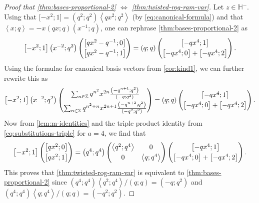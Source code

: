 \documentclass[reqno,11pt]{amsart}
\theoremstyle{definition}
\theoremstyle{remark}
\numberwithin{equation}{section}
\newcommand{\Z}{\mathbb{Z}}
\renewcommand{\H}{{\mathbb{H}}}
\newcommand{\la}{\left\langle}
\newcommand{\ra}{\right\rangle}
\newcommand{\vect}[2]{\big[{#1};{#2}\big]}
\begin{document}
\begin{proof}[Proof that \cref{thm:bases-proportional-2} $\Leftrightarrow$ \cref{thm:twisted-rog-ram-var}]
Let $z \in \H^-$. Using that $\vect{-x^2}{1} = \left(q^2; q^2\right)\la qx^2; q^2 \ra$ (by \cref{eq:canonical-formula}) and that $\la x; q \ra = -x (qx; q)\left(x^{-1}; q\right)$, one can rephrase \cref{thm:bases-proportional-2} as
\[
    \vect{-x^2}{1}\left(x^{-2}; q^2\right)
    \begin{pmatrix}
    \vect{qx^2-q^{-1}}{0} 
    \vspace{0.1cm} \\
    \vect{qx^2-q^{-1}}{1} 
    \end{pmatrix}
    =
    (q; q)
    \begin{pmatrix}
    \vect{-qx^4}{1}
    \vspace{0.1cm} \\
    \vect{-qx^4}{0} + \vect{-qx^4}{2} 
    \end{pmatrix}.
\]
Using the formulae for canonical basis vectors from \cref{cor:kind1}, we can further rewrite this as
\[
    \vect{-x^2}{1}\left(x^{-2}; q^2\right)
    \begin{pmatrix}
    \sum_{n \in \Z} q^{n^2} x^{2n} \frac{\left(-q^{n+1}; q^2\right)}{\left(-q; q^2\right)}
    \vspace{0.1cm} \\
    \sum_{n \in \Z} q^{n^2+n} x^{2n+1} \frac{\left(-q^{n+2}; q^2\right)}{\left(-q^2; q^2\right)}
    \end{pmatrix}
    =
    (q; q)
    \begin{pmatrix}
    \vect{-qx^4}{1}
    \vspace{0.1cm} \\
    \vect{-qx^4}{0} + \vect{-qx^4}{2} 
    \end{pmatrix}.
\]
Now from \cref{lem:m-identities} and the triple product identity from \cref{eq:substitutions-triple} for $a = 4$, we find that
\[
    \vect{-x^2}{1}
    \begin{pmatrix}
    \vect{qx^2}{0} 
    \vspace{0.1cm} \\
    \vect{qx^2}{1} 
    \end{pmatrix}
    =
    \left(q^4; q^4\right)
    \begin{pmatrix}
    \la q^2; q^4 \ra & 0 
    \vspace{0.1cm} \\
    0 & \la q; q^4 \ra
    \end{pmatrix}
    \begin{pmatrix}
    \vect{-qx^4}{1}
    \vspace{0.1cm} \\
    \vect{-qx^4}{0} + \vect{-qx^4}{2} 
    \end{pmatrix}.
\]  
This proves that \cref{thm:twisted-rog-ram-var} is equivalent to \cref{thm:bases-proportional-2} since $\left(q^4; q^4\right)\la q^2; q^4 \ra / (q; q) = \left(-q; q^2\right)$ and $\left(q^4; q^4\right)\la q; q^4 \ra / (q; q) = \left(-q^2; q^2\right)$.
\end{proof}
\end{document}
